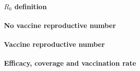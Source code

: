 \paragraph{$R_0$ definition}
\paragraph{No  vaccine reproductive number}
\paragraph{Vaccine reproductive number}
\paragraph{Efficacy, coverage and vaccination rate}


